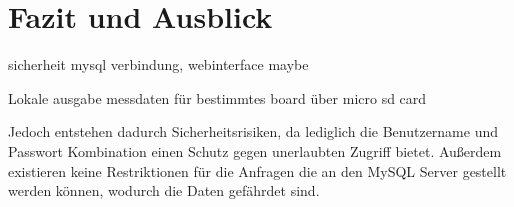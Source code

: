 \chapter{Fazit und Ausblick}
sicherheit mysql verbindung, webinterface maybe

Lokale ausgabe messdaten für bestimmtes board über micro sd card

Jedoch entstehen dadurch Sicherheitsrisiken, da lediglich die Benutzername und Passwort Kombination einen Schutz gegen unerlaubten Zugriff bietet. Außerdem existieren keine Restriktionen für die Anfragen die an den MySQL Server gestellt werden können, wodurch die Daten gefährdet sind.
